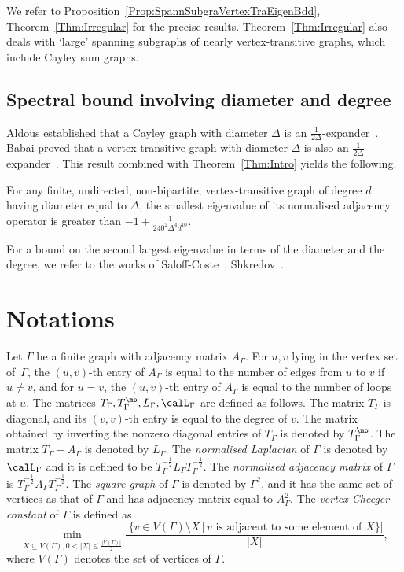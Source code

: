 We refer to Proposition~\ref{Prop:SpannSubgraVertexTraEigenBdd}, Theorem~\ref{Thm:Irregular} for the precise results. Theorem~\ref{Thm:Irregular} also deals with `large' spanning subgraphs of nearly vertex-transitive graphs, which include Cayley sum graphs. 

\subsection{Spectral bound involving diameter and degree}

Aldous established that a Cayley graph with diameter $\Delta$ is an $\frac 1{2\Delta}$-expander~\cite[Lemma 3.1]{AldousMarkovChainSimulation}. Babai proved that a vertex-transitive graph with diameter $\Delta$ is also an $\frac 1 {2\Delta}$-expander~\cite[Proposition 3.5]{BabaiLocalExpansionVertexTransitive}. This result combined with Theorem~\ref{Thm:Intro} yields the following. 

\begin{theorem}
\label{Thm:IntroDiam}
For any finite, undirected, non-bipartite, vertex-transitive graph of degree $d$ having diameter equal to $\Delta$, the smallest eigenvalue of its normalised adjacency operator is greater than $-1 + \frac{1}{240^2 \Delta^4 d^{10}}$.
\end{theorem}

For a bound on the second largest eigenvalue in terms of the diameter and the degree, we refer to the works of Saloff-Coste~\cite[Corollary 3.2.7]{SaloffCosteLectureFiniteMarkovChain}, Shkredov~\cite{ShkredovSpectralGapDiamCayley}.


\section{Notations}
Let $\Gamma$ be a finite graph with adjacency matrix $A_\Gamma$. 
For $u, v$ lying in the vertex set of~$\Gamma$, the $(u,v)$-th entry of $A_\Gamma$ is equal to the number of edges from $u$ to $v$ if $u\neq v$, and  for $u = v$, the $(u,v)$-th entry of $A_\Gamma$ is equal to the number of loops at $u$. The matrices $T_\Gamma, T_\Gamma^\mo, L_\Gamma, \calL_\Gamma$ are defined as follows. The matrix $T_\Gamma$ is diagonal, and its $(v, v)$-th entry is equal to the degree of $v$. The matrix obtained by inverting the nonzero diagonal entries of $T_\Gamma$ is denoted by $T_\Gamma^\mo$. The matrix $T_\Gamma - A_\Gamma$ is denoted by $L_\Gamma$. The \textit{normalised Laplacian} of $\Gamma$ is denoted by $\calL_\Gamma$ and it is defined to be $T_\Gamma^{-\frac 12} L_\Gamma T_\Gamma^{- \frac 12}$. The \textit{normalised adjacency matrix} of $\Gamma$ is $T_\Gamma^{-\frac 12} A_\Gamma T_\Gamma^{- \frac 12}$. The \textit{square-graph} of $\Gamma$ is denoted by $\Gamma^2$, and it has the same set of vertices as that of $\Gamma$ and has adjacency matrix equal to $A_\Gamma^2$. The \textit{vertex-Cheeger constant} of $\Gamma$ is defined as 
$$\min_{X\subseteq V(\Gamma), 0 < |X| \leq \frac{|V(\Gamma)|}2}
\frac{|\{v\in V(\Gamma) \setminus X\,|\, v \text{ is adjacent to some element of } X\}|}{|X|}
,$$
where $V(\Gamma)$ denotes the set of vertices of $\Gamma$. 

